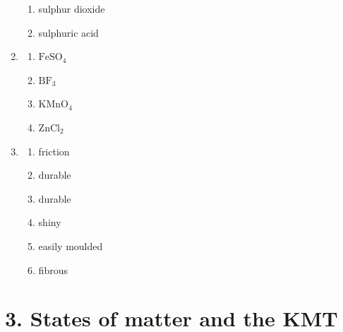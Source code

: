 \begin{multicols}{3}
\begin{enumerate}[itemsep=5pt, label=\textbf{\arabic*}. ]
\begin{enumerate}[itemsep=5pt,label=\textbf{(\alph*)}]
 \item sulphur dioxide
 \item sulphuric acid
\end{enumerate}
\item %
\begin{enumerate}[itemsep=5pt,label=\textbf{(\alph*)}]
 \item $\text{FeSO}_{4}$
 \item $\text{BF}_{3}$
 \item $\text{KMnO}_{4}$
 \item $\text{ZnCl}_{2}$
\end{enumerate}
\item %
\begin{enumerate}[itemsep=5pt,label=\textbf{(\alph*)}]
 \item friction
 \item durable
 \item durable
 \item shiny
 \item easily moulded
 \item fibrous
\end{enumerate}
\end{enumerate}
\end{multicols}

\section {3. States of matter and the KMT}
